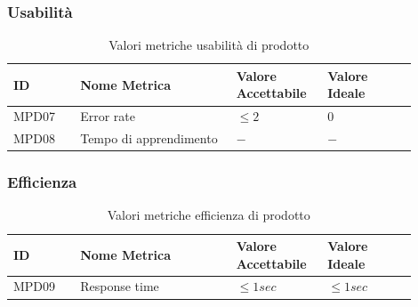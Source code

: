\documentclass[a4paper,12pt]{article}
\begin{document}
            \subsubsection{Usabilità}
            \begin{longtable}{|M{0.15\linewidth}|M{0.35\linewidth}|M{0.2\linewidth}|M{0.2\linewidth}|}

                \caption{Valori metriche usabilità di prodotto} \\
                \hline
                \textbf{ID} & \textbf{Nome Metrica} & \textbf{Valore Accettabile} & \textbf{Valore Ideale} \\
                \hline
                \endhead

                    MPD07 & Error rate & $\le2$ & $0$ \\
                    \hline

                    MPD08 & Tempo di apprendimento & $ - $ & $ - $ \\
                    \hline

            \end{longtable}

            \subsubsection{Efficienza}
            \begin{longtable}{|M{0.15\linewidth}|M{0.35\linewidth}|M{0.2\linewidth}|M{0.2\linewidth}|}

                \caption{Valori metriche efficienza di prodotto} \\
                \hline
                \textbf{ID} & \textbf{Nome Metrica} & \textbf{Valore Accettabile} & \textbf{Valore Ideale} \\
                \hline
                \endhead

                    MPD09 & Response time & $\le 1sec $ & $\le 1sec $  \\
                    \hline

            \end{longtable}
\end{document}
